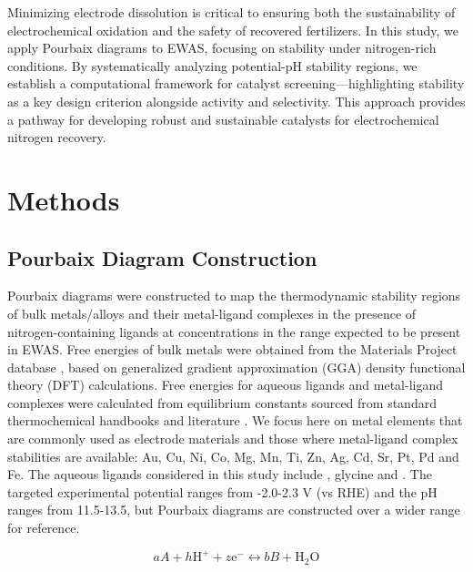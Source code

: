 Minimizing electrode dissolution is critical to ensuring both the sustainability of electrochemical oxidation and the safety of recovered fertilizers. In this study, we apply Pourbaix diagrams to EWAS, focusing on stability under nitrogen-rich conditions. By systematically analyzing potential-pH stability regions, we establish a computational framework for catalyst screening—highlighting stability as a key design criterion alongside activity and selectivity. This approach provides a pathway for developing robust and sustainable catalysts for electrochemical nitrogen recovery.


\section{Methods}
\subsection{Pourbaix Diagram Construction}
Pourbaix diagrams were constructed to map the thermodynamic stability regions of bulk metals/alloys and their metal-ligand complexes in the presence of nitrogen-containing ligands at concentrations in the range expected to be present in EWAS.
Free energies of bulk metals were obtained from the Materials Project database \cite{Jain2013TheInnovation}, based on generalized gradient approximation (GGA) density functional theory (DFT) calculations. Free energies for aqueous ligands and metal-ligand complexes were calculated from equilibrium constants sourced from standard thermochemical handbooks \cite{Wagman1982TheUnits, Smith1989CriticalConstants, Bard2017StandardSolution, Bjerrum1957StabilitySubstances} and literature \cite{Meng1996PrinciplesReview, Azadi2019DataComplexes, Aviles2022ExploringNH3, Oraby2023SelectiveSolutions, Harrington2005DeterminationIon}. We focus here on metal elements that are commonly used as electrode materials and those where metal-ligand complex stabilities are available: Au, Cu, Ni, Co, Mg, Mn, Ti, Zn, Ag, Cd, Sr, Pt, Pd and Fe. The aqueous ligands considered in this study include , glycine and . The targeted experimental potential ranges from -2.0-2.3 V (vs RHE) and the pH ranges from 11.5-13.5, but Pourbaix diagrams are constructed over a wider range for reference.

\begin{equation} \label{eq:reaction}
aA + h\text{H}^+ + z\text{e}^- \leftrightarrow bB + \text{H}_2\text{O}
\end{equation}

